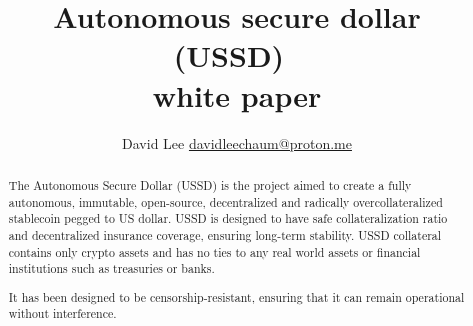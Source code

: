 \documentclass{article}
\begin{document}
\title{Autonomous secure dollar (USSD)\ \\white paper}

\author{David Lee \href{mailto:davidleechaum@proton.me}{davidleechaum@proton.me}}

\maketitle

%
\begin{abstract}
The Autonomous Secure Dollar (USSD) is the project aimed to create a fully autonomous,
immutable, open-source, decentralized and radically overcollateralized stablecoin
pegged to US dollar. USSD is designed to have safe collateralization ratio and
decentralized insurance coverage, ensuring long-term stability. USSD  collateral
contains only crypto assets and has no ties to any real world assets or financial
institutions such as treasuries or banks.

It has been designed to be censorship-resistant, ensuring that
it can remain operational without interference.


\end{abstract}


\newpage

\tableofcontents

\newpage




 
\end{document}
